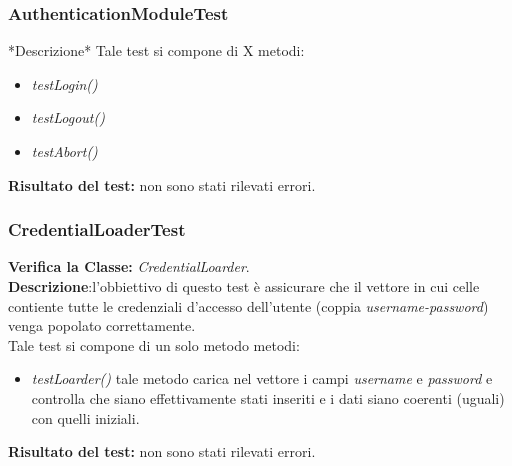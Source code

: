 \begin{table}
\end{table}

\subsubsection{AuthenticationModuleTest}
*Descrizione*
Tale test si compone di X metodi:
\begin{itemize}
\item \textit{testLogin() }
\item \textit{testLogout() }
\item \textit{testAbort() }
\end{itemize}
\textbf{Risultato del test:} non sono stati rilevati errori.

\begin{table}
\end{table}

\subsubsection{CredentialLoaderTest}
\textbf{Verifica la Classe:} \textit{CredentialLoarder}.\\
\textbf{Descrizione}:l'obbiettivo di questo test è assicurare che il vettore in cui celle contiente tutte le credenziali d'accesso dell'utente (coppia \textit{username-password}) venga popolato correttamente.\\
Tale test si compone di un solo metodo metodi:
\begin{itemize}
\item \textit{testLoarder() } tale metodo carica nel vettore i campi \textit{username} e \textit{password} e controlla che siano effettivamente stati inseriti e i dati siano coerenti (uguali) con quelli iniziali.
\end{itemize}
\textbf{Risultato del test:} non sono stati rilevati errori.

